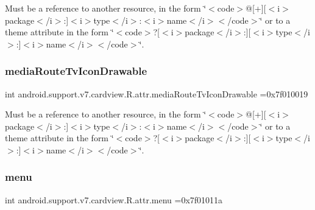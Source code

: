 Must be a reference to another resource, in the form \char`\"{}$<$code$>$@\mbox{[}+\mbox{]}\mbox{[}$<$i$>$package$<$/i$>$\+:\mbox{]}$<$i$>$type$<$/i$>$\+:$<$i$>$name$<$/i$>$$<$/code$>$\char`\"{} or to a theme attribute in the form \char`\"{}$<$code$>$?\mbox{[}$<$i$>$package$<$/i$>$\+:\mbox{]}\mbox{[}$<$i$>$type$<$/i$>$\+:\mbox{]}$<$i$>$name$<$/i$>$$<$/code$>$\char`\"{}. \mbox{\label{classandroid_1_1support_1_1v7_1_1cardview_1_1R_1_1attr_a538c7ade0ab0f6512c286e58421e54a7}} 
\subsubsection{\texorpdfstring{media\+Route\+Tv\+Icon\+Drawable}{mediaRouteTvIconDrawable}}
{\footnotesize\ttfamily int android.\+support.\+v7.\+cardview.\+R.\+attr.\+media\+Route\+Tv\+Icon\+Drawable =0x7f010019\hspace{0.3cm}{\ttfamily [static]}}

Must be a reference to another resource, in the form \char`\"{}$<$code$>$@\mbox{[}+\mbox{]}\mbox{[}$<$i$>$package$<$/i$>$\+:\mbox{]}$<$i$>$type$<$/i$>$\+:$<$i$>$name$<$/i$>$$<$/code$>$\char`\"{} or to a theme attribute in the form \char`\"{}$<$code$>$?\mbox{[}$<$i$>$package$<$/i$>$\+:\mbox{]}\mbox{[}$<$i$>$type$<$/i$>$\+:\mbox{]}$<$i$>$name$<$/i$>$$<$/code$>$\char`\"{}. \mbox{\label{classandroid_1_1support_1_1v7_1_1cardview_1_1R_1_1attr_afc99d2d0e0fecb1c2703d65bd4e1ec0c}} 
\subsubsection{\texorpdfstring{menu}{menu}}
{\footnotesize\ttfamily int android.\+support.\+v7.\+cardview.\+R.\+attr.\+menu =0x7f01011a\hspace{0.3cm}{\ttfamily [static]}}


